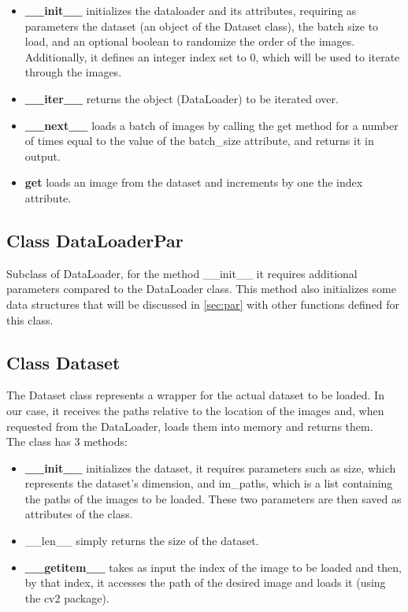 \documentclass[10pt,twocolumn,letterpaper]{article}
\newcommand{\bit} {\begin{itemize} }
\newcommand{\eit} {\end{itemize} }
\begin{document}
\bit
    \item{\textbf{\_\_init\_\_} initializes the dataloader and its attributes, requiring as parameters the dataset (an object of the Dataset class), the batch size to load, and an optional boolean to randomize the order of the images. Additionally, it defines an integer index set to 0, which will be used to iterate through the images.}
    \item{\textbf{\_\_iter\_\_} returns the object (DataLoader) to be iterated over.}
    \item{\textbf{\_\_next\_\_} loads a batch of images by calling the get method for a number of times equal to the value of the batch\_size attribute, and returns it in output.}
    \item{\textbf{get} loads an image from the dataset and increments by one the index attribute.}
\eit

\subsection{Class DataLoaderPar}
Subclass of DataLoader, for the method \_\_init\_\_ it requires additional parameters compared to the DataLoader class. This method also initializes some data structures that will be discussed in \cref{sec:par} with other functions defined for this class.

\subsection{Class Dataset}
The Dataset class represents a wrapper for the actual dataset to be loaded. In our case, it receives the paths relative to the location of the images and, when requested from the DataLoader, loads them into memory and returns them.\\
The class has 3 methods:

\bit
    \item{\textbf{\_\_init\_\_}} initializes the dataset, it requires parameters such as size, which represents the dataset's dimension, and im\_paths, which is a list containing the paths of the images to be loaded. These two parameters are then saved as attributes of the class.
    \item{\_\_len\_\_} simply returns the size of the dataset.
    \item{\textbf{\_\_getitem\_\_}} takes as input the index of the image to be loaded and then, by that index, it accesses the path of the desired image and loads it (using the cv2 package).
\eit
\end{document}
